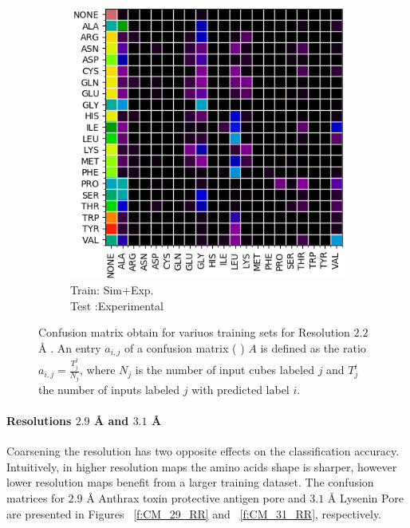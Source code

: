 \begin{figure}[!ht]
\begin{minipage}[b]{0.49\linewidth}
\begin{subfigure}[b]{\linewidth}
	\includegraphics[width=1.\textwidth]{pics/CM_22_RSR.png}
	\caption{\scriptsize
	Train: Sim+Exp. \\
	Test :Experimental}
	\label{f:CM_22_RSR}
\end{subfigure}
\end{minipage}
\caption{Confusion matrix obtain for variuos training sets  for Resolution $2.2 $ {\AA} .
An entry $a_{i,j}$  of a confusion matrix ( \cite{Bartesaghi2015}) $A$ is defined as the ratio  $a_{i,j} = \frac{T_j^j}{N_j}$,  where  $N_j$ is the number of input cubes labeled $j$ and  $T_j^i$ the number of inputs labeled $j$ with predicted label $i$.
}
\vspace{-3mm}
\end{figure}

\paragraph{Resolutions $2.9$ {\AA}  and   $3.1$ {\AA}  }
Coarsening the resolution has two opposite effects on the classification accuracy.
Intuitively, in higher resolution maps the amino acids shape is sharper, however lower resolution maps benefit from a larger training dataset.
The confusion matrices for $2.9$ {\AA}  Anthrax toxin protective antigen pore and $3.1$ {\AA}   Lysenin Pore are presented in Figures ~\ref{f:CM_29_RR} and ~\ref{f:CM_31_RR}, respectively. 

